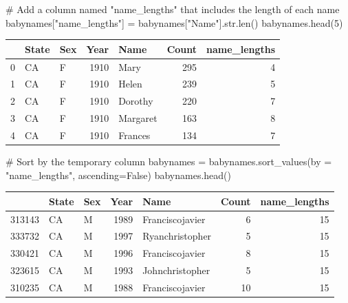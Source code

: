 \documentclass[
  letterpaper,
  DIV=11,
  numbers=noendperiod]{scrreprt}
\newenvironment{Shaded}{\begin{snugshade}}{\end{snugshade}}
\newcommand{\BuiltInTok}[1]{\textcolor[rgb]{0.00,0.23,0.31}{#1}}
\newcommand{\CommentTok}[1]{\textcolor[rgb]{0.37,0.37,0.37}{#1}}
\newcommand{\DecValTok}[1]{\textcolor[rgb]{0.68,0.00,0.00}{#1}}
\newcommand{\NormalTok}[1]{\textcolor[rgb]{0.00,0.23,0.31}{#1}}
\newcommand{\OperatorTok}[1]{\textcolor[rgb]{0.37,0.37,0.37}{#1}}
\newcommand{\StringTok}[1]{\textcolor[rgb]{0.13,0.47,0.30}{#1}}
\newcommand{\VariableTok}[1]{\textcolor[rgb]{0.07,0.07,0.07}{#1}}
\begin{document}
\begin{Shaded}
\begin{Highlighting}[]
\CommentTok{\# Add a column named "name\_lengths" that includes the length of each name}
\NormalTok{babynames[}\StringTok{"name\_lengths"}\NormalTok{] }\OperatorTok{=}\NormalTok{ babynames[}\StringTok{"Name"}\NormalTok{].}\BuiltInTok{str}\NormalTok{.}\BuiltInTok{len}\NormalTok{()}
\NormalTok{babynames.head(}\DecValTok{5}\NormalTok{)}
\end{Highlighting}
\end{Shaded}

\begin{tabular}{lllrlrr}
\toprule
{} & State & Sex &  Year &      Name &  Count &  name\_lengths \\
\midrule
0 &    CA &   F &  1910 &      Mary &    295 &             4 \\
1 &    CA &   F &  1910 &     Helen &    239 &             5 \\
2 &    CA &   F &  1910 &   Dorothy &    220 &             7 \\
3 &    CA &   F &  1910 &  Margaret &    163 &             8 \\
4 &    CA &   F &  1910 &   Frances &    134 &             7 \\
\bottomrule
\end{tabular}

\begin{Shaded}
\begin{Highlighting}[]
\CommentTok{\# Sort by the temporary column}
\NormalTok{babynames }\OperatorTok{=}\NormalTok{ babynames.sort\_values(by }\OperatorTok{=} \StringTok{"name\_lengths"}\NormalTok{, ascending}\OperatorTok{=}\VariableTok{False}\NormalTok{)}
\NormalTok{babynames.head()}
\end{Highlighting}
\end{Shaded}

\begin{tabular}{lllrlrr}
\toprule
{} & State & Sex &  Year &             Name &  Count &  name\_lengths \\
\midrule
313143 &    CA &   M &  1989 &  Franciscojavier &      6 &            15 \\
333732 &    CA &   M &  1997 &  Ryanchristopher &      5 &            15 \\
330421 &    CA &   M &  1996 &  Franciscojavier &      8 &            15 \\
323615 &    CA &   M &  1993 &  Johnchristopher &      5 &            15 \\
310235 &    CA &   M &  1988 &  Franciscojavier &     10 &            15 \\
\bottomrule
\end{tabular}
\end{document}
